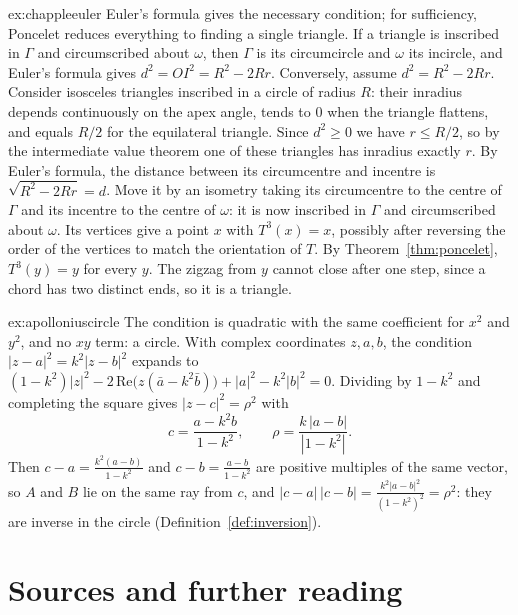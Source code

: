 \begin{solution}{ex:chappleeuler}
\idea Euler's formula gives the necessary condition; for sufficiency, Poncelet reduces everything to finding a single triangle.
\writeup If a triangle is inscribed in $\Gamma$ and circumscribed about $\omega$, then $\Gamma$ is its circumcircle and $\omega$ its incircle, and Euler's
formula gives $d^2=OI^2=R^2-2Rr$. Conversely, assume $d^2=R^2-2Rr$. Consider isosceles triangles inscribed in a circle of radius $R$: their inradius
depends continuously on the apex angle, tends to $0$ when the triangle flattens, and equals $R/2$ for the equilateral triangle. Since $d^2\ge0$ we
have $r\le R/2$, so by the intermediate value theorem one of these triangles has inradius exactly $r$. By Euler's formula, the distance between its
circumcentre and incentre is $\sqrt{R^2-2Rr}=d$. Move it by an isometry taking its circumcentre to the centre of $\Gamma$ and its incentre to the
centre of $\omega$: it is now inscribed in $\Gamma$ and circumscribed about $\omega$. Its vertices give a point $x$ with $T^3(x)=x$, possibly after
reversing the order of the vertices to match the orientation of $T$. By Theorem~\ref{thm:poncelet}, $T^3(y)=y$ for every $y$. The zigzag from $y$
cannot close after one step, since a chord has two distinct ends, so it is a triangle.
\end{solution}

\begin{solution}{ex:apolloniuscircle}
\idea The condition is quadratic with the same coefficient for $x^2$ and $y^2$, and no $xy$ term: a circle.
\writeup With complex coordinates $z,a,b$, the condition $|z-a|^2=k^2|z-b|^2$ expands to
$(1-k^2)|z|^2-2\,\mathrm{Re}\bigl(z(\bar a-k^2\bar b)\bigr)+|a|^2-k^2|b|^2=0$. Dividing by $1-k^2$ and completing the square gives $|z-c|^2=\rho^2$ with
\[
c=\frac{a-k^2b}{1-k^2},\qquad \rho=\frac{k\,|a-b|}{|1-k^2|}.
\]
Then $c-a=\frac{k^2(a-b)}{1-k^2}$ and $c-b=\frac{a-b}{1-k^2}$ are positive multiples of the same vector, so $A$ and $B$ lie on the same ray from $c$, and
$|c-a|\,|c-b|=\frac{k^2|a-b|^2}{(1-k^2)^2}=\rho^2$: they are inverse in the circle (Definition~\ref{def:inversion}).
\end{solution}

\section*{Sources and further reading}

